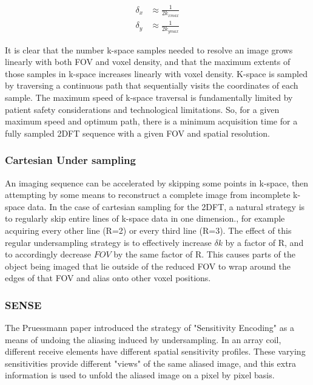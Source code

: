 \begin{equation}\label{eq:spatial_resolution}
    \begin{aligned}
        \delta_x &\approx \frac{1}{2k_{xmax}}\\
        \delta_y &\approx \frac{1}{2k_{ymax}}
    \end{aligned}
\end{equation}

It is clear that the number k-space samples needed to resolve an image grows linearly with both FOV and voxel density,
and that the maximum extents of those samples in k-space increases linearly with voxel density. K-space is sampled by
traversing a continuous path that sequentially visits the coordinates of each sample. The maximum speed of k-space
traversal is fundamentally limited by patient safety considerations and technological limitations. So, for a given
maximum speed and optimum path, there is a minimum acquisition time for a fully sampled 2DFT sequence with a given FOV
and spatial resolution.

\subsubsection{Cartesian Under sampling}
An imaging sequence can be accelerated by skipping some points in k-space, then attempting by some means to reconstruct
a complete image from incomplete k-space data. In the case of cartesian sampling for the 2DFT, a natural strategy is to
regularly skip entire lines of k-space data in one dimension.\cite{Pruessmann1999}, for example acquiring every other
line (R=2) or every third line (R=3). The effect of this regular undersampling strategy is to effectively increase
$\delta k$ by a factor of R, and to accordingly decrease $FOV$ by the same factor of R. This causes parts of the object
being imaged that lie outside of the reduced FOV to wrap around the edges of that FOV and alias onto other voxel
positions.

\subsubsection{SENSE}
The Pruessmann paper \cite{Pruessmann1999} introduced the strategy of "Sensitivity Encoding" as a means of undoing the
aliasing induced by undersampling. In an array coil, different receive elements have different spatial sensitivity
profiles. These varying sensitivities provide different "views" of the same aliased image, and this extra information is
used to unfold the aliased image on a pixel by pixel basis.

